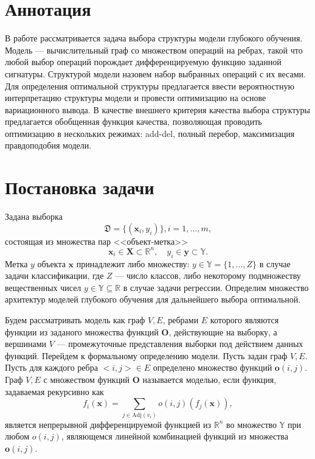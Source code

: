 \documentclass[12pt]{article}
\begin{document}
\section{Аннотация}
В работе рассматривается задача выбора структуры модели глубокого обучения. Модель --- вычислительный граф со множеством операций на ребрах, такой что любой выбор операций порождает дифференцируемую функцию заданной сигнатуры. Структурой модели назовем набор выбранных операций с их весами. Для определения оптимальной структуры предлагается ввести вероятностную интерпретацию структуры модели и провести оптимизацию на основе вариационного вывода. В качестве внешнего критерия качества выбора структуры предлагается обобщенная функция качества, позволяющая проводить оптимизацию в нескольких режимах: add-del, полный перебор, максимизация правдоподобия модели.


\section{Постановка задачи}
Задана выборка  \begin{equation}\label{eq:dataset}\mathfrak{D} = \{(\mathbf{x}_i,y_i)\}, i = 1,\dots,m,\end{equation} состоящая из множества пар <<объект-метка>> $$\mathbf{x}_i \in \mathbf{X} \subset \mathbb{R}^n, \quad {y}_i \in \mathbf{y} \subset \mathbb{Y}.$$ Метка ${y}$  объекта $\mathbf{x}$ принадлежит либо множеству: ${y} \in \mathbb{Y} = \{1, \dots, Z\}$ в случае задачи классификации, где $Z$ --- число классов, либо некоторому подмножеству вещественных чисел ${y} \in \mathbb{Y}  \subseteq \mathbb{R}$ в случае задачи регрессии. Определим множество архитектур моделей глубокого обучения для дальнейшего выбора оптимальной. 

Будем рассматривать модель как граф $V,E$, ребрами $E$ которого являются функции из заданого множества функций $\mathbf{O}$, действующие на выборку, а вершинами $V$ --- промежуточные представления выборки под действием данных функций. Перейдем к формальному определению модели.
Пусть задан граф $V,E$. Пусть для каждого ребра $<i,j> \in E$ определено множество функций $\mathbf{o}(i,j)$. Граф $V, E$ с множеством функций $\mathbf{O}$ называется моделью, если функция, задаваемая рекурсивно как 
\[
    f_i(\mathbf{x}) = \sum_{j \in \text{Adj}(v_i)} o(i,j) (f_{j}(\mathbf{x})), 
\]
является непрерывной дифференцируемой функцией из $\mathbb{R}^n$ во множество $\mathbb{Y}$ при любом $o(i,j)$, являющемся линейной комбинацией функций из множества $\mathbf{o}(i,j)$.
\end{document}

